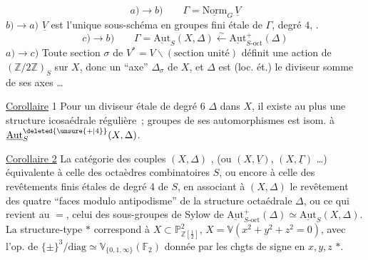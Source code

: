 \[
 a)\longrightarrow b)\qquad \Gamma=\underline{\mathrm{Norm}}_G\,\underline V
\]
$b)\longrightarrow a)$ \quad $\underline V$ est l'unique sous-schéma en groupes  fini étale de $\Gamma$,  degré $4$, .
\[
 c)\longrightarrow b)\qquad \Gamma=\underline{\mathrm{Aut}}_S(X,\Delta)\xleftarrow{\sim}\underline{\mathrm{Aut}}^+_{S\text{-oct}}(\Delta)
\]
$a)\longrightarrow c)$ \quad {} Toute section $\sigma$ de $V^*=V\smallsetminus(\text{section unité})$ définit une action  de  $(\mathbb Z/2\mathbb Z)_S$ sur $X$, donc un ``axe'' $\Delta_\sigma$ de $X$, et $\Delta$ est  (loc. ét.) le  diviseur somme de ses axes \ldots

\uline{Corollaire} 1 \quad Pour un diviseur étale de degré 6 $\Delta$ dans $X$, il existe au plus une structure icosaédrale régulière~;    groupes de ses automorphismes  est isom. à $\underline{\mathrm{Aut}}_S^{\deleted{\unsure{+|4}}}(X,\Delta)$.

\uline{Corollaire 2} \quad La catégorie des couples $(X,\Delta)$ , (ou $(X,\underline V)$, $(X,\underline\Gamma)$ \ldots)   équivalente à celle des octaèdres  combinatoires \inserted{$\Delta$}  $S$, ou encore à celle des revêtements finis étales   de degré 4 de $S$, en associant à  $(X,\Delta)$ le revêtement des quatre ``faces modulo antipodisme'' de la structure octaédrale $\Delta$, ou ce qui revient au $=$, celui des sous-groupes de Sylow de  $\underline{\mathrm{Aut}}^+_{S\text{-oct}}(\Delta)\simeq\underline{\mathrm{Aut}}_S(X,\Delta)$.
La structure-type $*$ correspond à  $X\subset\mathbb P^2_{\mathbb Z[\frac12]}$, $X=\mathbb V(x^2+y^2+z^2=0)$, avec l'op. de  $\{\pm\}^3/\mathrm{diag}\simeq\mathbb V_{\{0,1,\infty\}}(\mathbb F_2)$ donnée par les chgts de signe en $x,y,z$ $*$.

